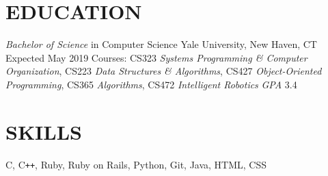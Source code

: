 \documentclass[margin, centered]{res}
\begin{document}
\address{\href{mailto:melina.delgado@yale.edu}{melina.delgado@yale.edu} | \href{http://melinadelgado.com}{melinadelgado.com} \\ 130 Prospect St, New Haven, CT 06511 | (954) 682-8999}

\begin{resume}
  \section{EDUCATION}
  \textit{Bachelor of Science} in Computer Science \newline
  Yale University, New Haven, CT \newline 
  Expected May 2019 \newline
  Courses: CS323 \textit{Systems Programming \& Computer Organization}, CS223 \textit{Data Structures \& Algorithms}, CS427 \textit{Object-Oriented Programming}, CS365 \textit{Algorithms}, CS472 \textit{Intelligent Robotics} \newline 
  \textit{GPA} 3.4

  \section{SKILLS}
  C, C\texttt{++}, Ruby, Ruby on Rails, Python, Git, Java, HTML, CSS


\end{resume}
\end{document}
